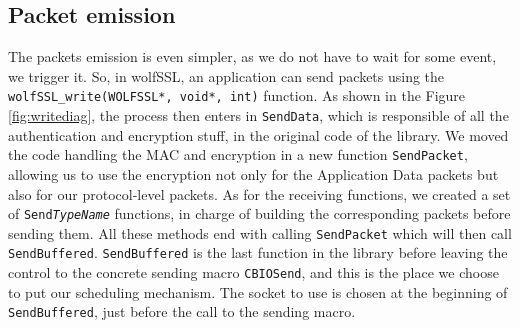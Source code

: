 \subsection{Packet emission}\label{sec:packet-emission}

The packets emission is even simpler, as we do not have to wait for some event, we trigger it. So, in wolfSSL, an application can send packets using the \texttt{wolfSSL\_write(WOLFSSL*, void*, int)} function. As shown in the Figure \ref{fig:writediag}, the process then enters in \texttt{SendData}, which is responsible of all the authentication and encryption stuff, in the original code of the library. We moved the code handling the MAC and encryption in a new function \texttt{SendPacket}, allowing us to use the encryption not only for the Application Data packets but also for our protocol-level packets. As for the receiving functions, we created a set of \texttt{Send\textit{TypeName}} functions, in charge of building the corresponding packets before sending them. All these methods end with calling \texttt{SendPacket} which will then call \texttt{SendBuffered}. \texttt{SendBuffered} is the last function in the library before leaving the control to the concrete sending macro \texttt{CBIOSend}, and this is the place we choose to put our scheduling mechanism. The socket to use is chosen at the beginning of \texttt{SendBuffered}, just before the call to the sending macro.

